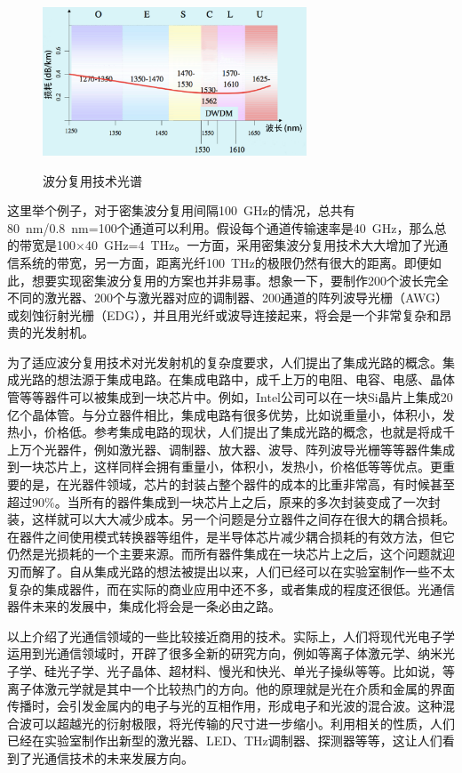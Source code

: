 \documentclass{ZJUthesis}
\begin{document}
\begin{figure}[htbp]
  \centering
  \includegraphics[width=0.7\textwidth]{./Pictures/wdm.eps}\\
  \caption{波分复用技术光谱}
  \label{fig_wdm}
\end{figure}

这里举个例子，对于密集波分复用间隔100~GHz的情况，总共有80~nm/0.8~nm=100个通道可以利用。假设每个通道传输速率是40~GHz，那么总的带宽是100×40~GHz=4~THz。一方面，采用密集波分复用技术大大增加了光通信系统的带宽，另一方面，距离光纤100~THz的极限仍然有很大的距离。即便如此，想要实现密集波分复用的方案也并非易事。想象一下，要制作200个波长完全不同的激光器、200个与激光器对应的调制器、200通道的阵列波导光栅（AWG）或刻蚀衍射光栅（EDG），并且用光纤或波导连接起来，将会是一个非常复杂和昂贵的光发射机。

为了适应波分复用技术对光发射机的复杂度要求，人们提出了集成光路的概念。集成光路的想法源于集成电路。在集成电路中，成千上万的电阻、电容、电感、晶体管等等器件可以被集成到一块芯片中。例如，Intel公司可以在一块Si晶片上集成20亿个晶体管。与分立器件相比，集成电路有很多优势，比如说重量小，体积小，发热小，价格低。参考集成电路的现状，人们提出了集成光路的概念，也就是将成千上万个光器件，例如激光器、调制器、放大器、波导、阵列波导光栅等等器件集成到一块芯片上，这样同样会拥有重量小，体积小，发热小，价格低等等优点。更重要的是，在光器件领域，芯片的封装占整个器件的成本的比重非常高，有时候甚至超过90\%。当所有的器件集成到一块芯片上之后，原来的多次封装变成了一次封装，这样就可以大大减少成本。另一个问题是分立器件之间存在很大的耦合损耗。在器件之间使用模式转换器等组件，是半导体芯片减少耦合损耗的有效方法，但它仍然是光损耗的一个主要来源。而所有器件集成在一块芯片上之后，这个问题就迎刃而解了。自从集成光路的想法被提出以来，人们已经可以在实验室制作一些不太复杂的集成器件，而在实际的商业应用中还不多，或者集成的程度还很低。光通信器件未来的发展中，集成化将会是一条必由之路。

以上介绍了光通信领域的一些比较接近商用的技术。实际上，人们将现代光电子学运用到光通信领域时，开辟了很多全新的研究方向，例如等离子体激元学、纳米光子学、硅光子学、光子晶体、超材料、慢光和快光、单光子操纵等等。比如说，等离子体激元学就是其中一个比较热门的方向。他的原理就是光在介质和金属的界面传播时，会引发金属内的电子与光的互相作用，形成电子和光波的混合波。这种混合波可以超越光的衍射极限，将光传输的尺寸进一步缩小。利用相关的性质，人们已经在实验室制作出新型的激光器\cite{Jones2009Photonic}、LED、THz调制器\cite{Fattal2008Design}、探测器\cite{Palmer2009Surface}等等，这让人们看到了光通信技术的未来发展方向。
\end{document}

